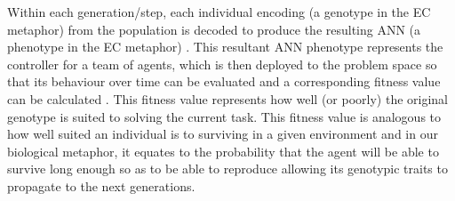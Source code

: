 

Within each generation/step, each individual encoding (a genotype in the EC metaphor) from the population is decoded to produce the resulting ANN (a phenotype in the EC metaphor) \cite{Miikkulainen2010}. 
This resultant ANN phenotype represents the controller for a team of agents, which is then deployed to the problem space so that its behaviour over time can be evaluated and a corresponding fitness value can be calculated \cite{Miikkulainen2010}. 
This fitness value represents how well (or poorly) the original genotype is suited to solving the current task. 
This fitness value is analogous to how well suited an individual is to surviving in a given environment and in our biological metaphor, it equates to the probability that the agent will be able to survive long enough so as to be able to reproduce allowing its genotypic traits to propagate to the next generations.



